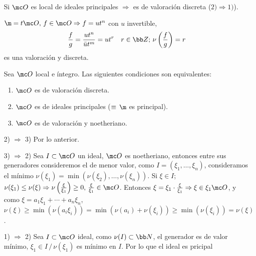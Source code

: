 \begin{prop}
    Si $\mc O$ es local de ideales principales $\Rightarrow $ es de valoraci\'on discreta ($2) \Rightarrow 1)$).
\end{prop}
\begin{dem}
    $\m = t\mc O, \, f\in \mc O \Rightarrow f=ut^n$ con $u$ invertible, 
    $$\frac{f}{g} = \frac{ut^n}{\bar u t^m} = u t^r \quad r \in \bb Z; \, \nu\left(\frac{f}{g}\right) = r$$
    es una valoraci\'on y discreta.
\end{dem}
\begin{teo}
    Sea $\mc O$ local e \'integro. Las siguientes condiciones son  equivalentes:
    \begin{enumerate}[1)]
        \item $\mc O$ es de valoraci\'on discreta.
        \item $\mc O$ es de ideales principales ($\equiv \, \m$ es principal).
        \item $\mc O$ es de valoraci\'on y noetheriano.
    \end{enumerate}
\end{teo}
\begin{dem}
    2) $\Rightarrow$ 3) Por lo anterior.

    3) $\Rightarrow$ 2) Sea $I\subset \mc O$ un ideal, $\mc O$ es noetheriano, entonces entre sus generadores consideremos el de menor valor, como $I = (\xi_1, \ldots, \xi_n)$, consideramos el m\'inimo $\nu(\xi_1)=\min (\nu(\xi_2), \ldots, \nu(\xi_n))$. Si $\xi \in I$; $\nu(\xi_1) \le \nu(\xi) \Rightarrow \nu \left( \frac{\xi}{\xi_1} \right) \ge 0, \, \frac{\xi}{\xi_1} \in \mc O$. Entonces $\xi = \xi_1 \cdot \frac{\xi}{\xi_1} \Rightarrow \xi \in \xi_1 \mc O$, y como $\xi = a_1\xi_1 + \cdots + a_n \xi_n$, $\nu(\xi) \ge \min(\nu(a_i\xi_i)) = \min(\nu(a_i)+ \nu(\xi_i)) \ge \min(\nu(\xi_i)) = \nu(\xi)$.

    1) $\Rightarrow$ 2) Sea $I \subset \mc O$ ideal, como $\nu(I) \subset \bb N$, el generador es de valor m\'inimo, $\xi_1 \in I \, / \, \nu(\xi_1)$ es m\'inimo en $I$. Por lo que el ideal es pricipal
\end{dem}
